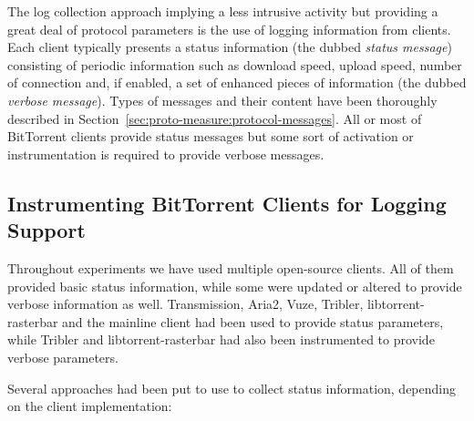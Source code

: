 The log collection approach implying a less intrusive activity but providing a
great deal of protocol parameters is the use of logging information from
clients. Each client typically presents a status information (the dubbed
\textit{status message}) consisting of periodic information such as download
speed, upload speed, number of connection and, if enabled, a set of enhanced
pieces of information (the dubbed \textit{verbose message}). Types of messages
and their content have been thoroughly described in
Section~\ref{sec:proto-measure:protocol-messages}. All or most of BitTorrent
clients provide status messages but some sort of activation or instrumentation
is required to provide verbose messages.

\subsection{Instrumenting BitTorrent Clients for Logging Support}

Throughout experiments we have used multiple open-source clients. All of them
provided basic status information, while some were updated or altered to
provide verbose information as well. Transmission, Aria2, Vuze, Tribler,
libtorrent-rasterbar and the mainline client had been used to provide status
parameters, while Tribler and libtorrent-rasterbar had also been instrumented
to provide verbose parameters.

Several approaches had been put to use to collect status information,
depending on the client implementation:

